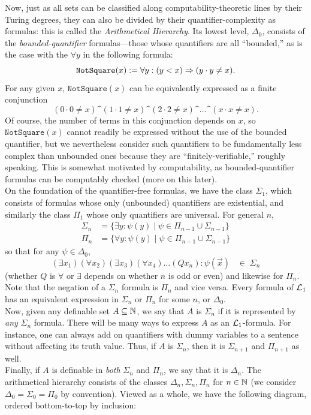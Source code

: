 \documentclass{amsart}
\begin{document}
	Now, just as all sets can be classified along computability-theoretic lines by their Turing degrees, they can also be divided by their quantifier-complexity as formulas: this is called the \textit{Arithmetical Hierarchy}. Its lowest level, $\Delta_0$, consists of the \textit{bounded-quantifier} formulas---those whose quantifiers are all ``bounded,'' as is the case with the $\forall y$ in the following formula:
	$$
	\mathtt{NotSquare}(x) := \forall y: (y<x)\Rightarrow (y\cdot y \neq x).
	$$
	For any given $x$, $\mathtt{NotSquare}(x)$ can be equivalently expressed as a finite conjunction
	$$
	(0\cdot 0 \neq x) \^ (1\cdot 1 \neq x) \^ (2\cdot 2 \neq x) \^ \dots \^ (x\cdot x \neq x).
	$$
	Of course, the number of terms in this conjunction depends on $x$, so $\mathtt{NotSquare}(x)$ cannot readily be expressed without the use of the bounded quantifier, but we nevertheless consider such quantifiers to be fundamentally less complex than unbounded ones because they are ``finitely-verifiable,'' roughly speaking. This is somewhat motivated by computability, as bounded-quantifier formulas can be computably checked (more on this later).\\
	\indent On the foundation of the quantifier-free formulas, we have the class $\Sigma_1$, which consists of formulas whose only (unbounded) quantifiers are existential, and similarly the class $\Pi_1$ whose only quantifiers are universal. For general $n$,
	\begin{align*}
		\Sigma_n &= \{\exists y: \psi(y) \;  |  \; \psi\in \Pi_{n-1} \cup \Sigma_{n-1}\} \\ \Pi_n &= \{\forall y: \psi(y) \; | \; \psi\in \Pi_{n-1}\cup \Sigma_{n-1}\}
	\end{align*}
	so that for any $\psi\in \Delta_0$,
	$$
	(\exists x_1) (\forall x_2) (\exists x_3) (\forall x_4) \dots (Q x_n): \psi(\vec{x}) \;\;\; \in \; \Sigma_n
	$$
	(whether $Q$ is $\forall$ or $\exists$ depends on whether $n$ is odd or even) and likewise for $\Pi_n$. Note that the negation of a $\Sigma_n$ formula is $\Pi_n$ and vice versa. Every formula of $\mathcal{L}_1$ has an equivalent expression in $\Sigma_n$ or $\Pi_n$ for some $n$, or $\Delta_0$.\\
	
	Now, given any definable set $A\subseteq \mathbb{N}$, we say that $A$ is $\Sigma_n$ if it is represented by \textit{any} $\Sigma_n$ formula. There will be many ways to express $A$ as an $\mathcal{L}_1$-formula. For instance, one can always add on quantifiers with dummy variables to a sentence without affecting its truth value. Thus, if $A$ is $\Sigma_n$, then it is $\Sigma_{n+1}$ and $\Pi_{n+1}$ as well.\\
	\indent Finally, if $A$ is definable in \textit{both} $\Sigma_n$ and $\Pi_n$, we say that it is $\Delta_n$. The arithmetical hierarchy consists of the classes $\Delta_n,\Sigma_n,\Pi_n$ for $n\in \mathbb{N}$ (we consider $\Delta_0=\Sigma_0=\Pi_0$ by convention). Viewed as a whole, we have the following diagram, ordered bottom-to-top by inclusion:
	
\end{document}
